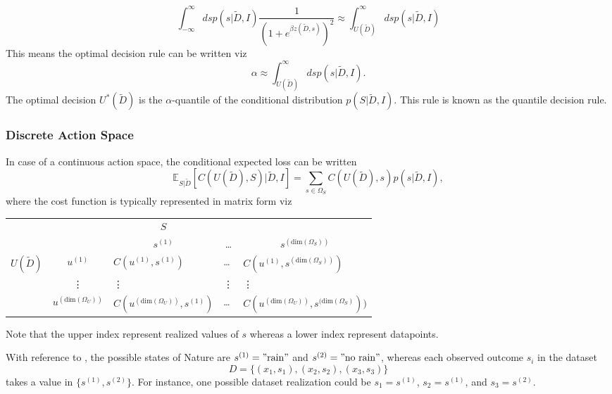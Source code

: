 \begin{example}
	\begin{equation}
		\int_{-\infty}^{\infty} ds p(s|\tilde{D},I)\frac{1}{(1+e^{\beta z(\tilde{D},s)})^2} \approx \int_{U(\tilde{D})}^{\infty} ds p(s|\tilde{D},I)
	\end{equation}
	This means the optimal decision rule can be written viz
	\begin{equation}
		\alpha \approx \int_{U(\tilde{D})}^{\infty} ds p(s|\tilde{D},I).
		\label{eq:quantile_decision_rule}
	\end{equation}
	The optimal decision $U^*(\tilde{D})$ is the $\alpha$-quantile of the conditional distribution $p(S|\tilde{D},I)$. This rule is known as the quantile decision rule.
\end{example}

\subsubsection{Discrete Action Space}
In case of a continuous action space, the conditional expected loss can be written
\begin{equation}
	\mathbb{E}_{S|\tilde{D}}[C(U(\tilde{D}), S)|\tilde{D},I] = \sum_{s\in \Omega_S}C(U(\tilde{D}),s)p(s|\tilde{D},I),
	\label{eq:conditional_cost_discrete}
\end{equation}
where the cost function is typically represented in matrix form viz
\begin{center}
	\begin{tabular}{ c  c  c  c  c  }
		&& $S$& & \\
		&& $s^{(1)}$ & \dots & $s^{(\text{dim}(\Omega_S))}$ \\
		\cline{3-5}
		$U(\tilde{D})$ & $u^{(1)}$& \multicolumn{1}{|l}{$C(u^{(1)}, s^{(1)})$} &\multicolumn{1}{l}{\dots}&\multicolumn{1}{l|}{$C(u^{(1)}, s^{(\text{dim}(\Omega_S))})$} \\
		& \vdots & \multicolumn{1}{|l}{\vdots} &\multicolumn{1}{l}{\vdots}&\multicolumn{1}{l|}{\vdots} \\
		& $u^{(\text{dim}(\Omega_U))}$ & \multicolumn{1}{|l}{$C(u^{(\text{dim}(\Omega_U))}, s^{(1)})$} &\multicolumn{1}{l}{\dots}&\multicolumn{1}{l|}{$C(u^{(\text{dim}(\Omega_U))}, s^{(\text{dim}(\Omega_S)}))$} \\
		\cline{3-5}
	\end{tabular}
\end{center}
Note that the upper index represent realized values of $s$ whereas a lower index represent datapoints.

\begin{example}
	With reference to , the possible states of Nature are $s^{(1)} = "\text{rain}"$ and $s^{(2)} = "\text{no rain}"$, whereas each observed outcome $s_i$ in the dataset 
	\begin{equation}
		D = \{(x_1,s_1),(x_2,s_2),(x_3,s_3)\}
	\end{equation}
	takes a value in $\{s^{(1)},s^{(2)}\}$. For instance, one possible dataset realization could be $s_1=s^{(1)}$, $s_2=s^{(1)}$, and $s_3=s^{(2)}$.
\end{example}

